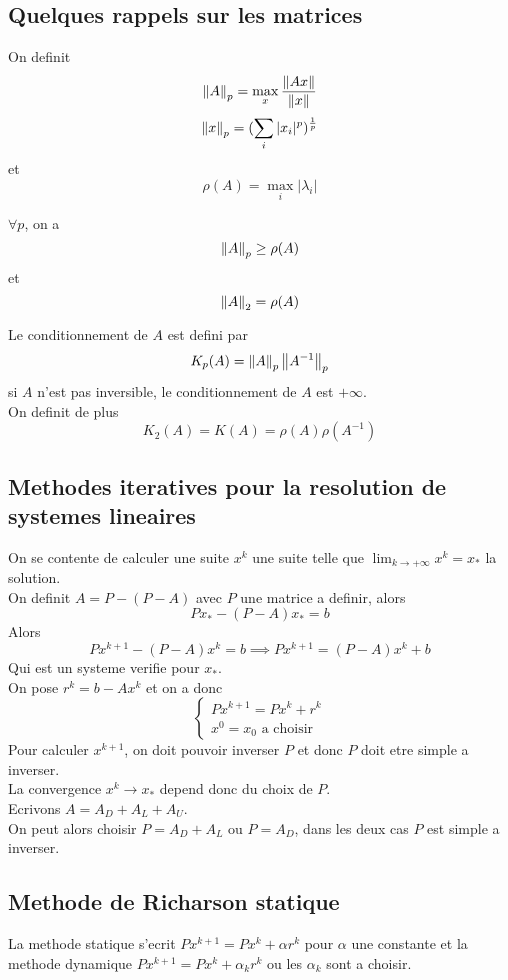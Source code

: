 \documentclass[../main.tex]{subfiles}
\begin{document}
\subsection{Quelques rappels sur les matrices}
On definit
\[ 
\left\lVert A\right\rVert _p = \max_{x}  \frac{ \left\lVert Ax\right\rVert }{\left\lVert x\right\rVert }
\]
\[ 
\left\lVert x\right\rVert _p = ( \sum_i |x_i| ^{p}) ^{\frac{1}{p}}
\]
et 
\[ 
\rho( A) = \max_i |\lambda_i|
\]
\begin{propo}
$\forall p$, on a 
\[ 
\left\lVert A\right\rVert _p \geq \rho( A) 
\]
et 
\[ 
\left\lVert A\right\rVert_2 = \rho( A) 
\]
\end{propo}
\begin{defn}
	Le conditionnement de $A$ est defini par
	\[ 
	K_p( A) = \left\lVert A\right\rVert _p \left\lVert A^{-1}\right\rVert_p
	\]
	si $A$ n'est pas inversible, le conditionnement de $A$ est $+ \infty $.\\
	On definit de plus
	\[ 
	K_2 ( A) = K( A) = \rho( A) \rho( A^{-1}) 
	\]
	
	
\end{defn}
\subsection{Methodes iteratives pour la resolution de systemes lineaires}
On se contente de calculer une suite $x^{k}$ une suite telle que $ \lim_{k \to  + \infty} x^{k} = x_*$ la solution.\\
On definit $ A= P - ( P-A) $ avec $ P$ une matrice a definir, alors
\[ 
Px_* - ( P-A) x_* = b
\]
Alors
\[ 
Px^{k+1}- ( P-A) x^{k}= b\implies P x^{k+1}= ( P-A) x^{k} + b
\]
Qui est un systeme verifie pour $x_*$.\\
On pose $r^{k}= b- Ax^{k}$ et on a donc
\[ 
\begin{cases}
P x^{k+1}= P x^{k} + r^{k}\\
x^{0}= x_0 \text{  a choisir } 
\end{cases}
\]
Pour calculer $x^{k+1}$, on doit pouvoir inverser $ P$ et donc $P$ doit etre simple a inverser.\\
La convergence $x^{k}\to x_*$ depend donc du choix de $P$.\\
Ecrivons $ A= A_D + A_L + A_U$.\\
On peut alors choisir $P = A_D + A_L$ ou  $ P= A_D$, dans les deux cas $ P$ est simple a inverser.
\subsection*{Methode de Richarson statique}
 La methode statique s'ecrit $ P x^{k+1}= P x^{k}+ \alpha r^{k}$ pour $\alpha $ une constante et la methode dynamique $ Px^{k+1}= Px^{k}+ \alpha_k r^{k}$ ou les $\alpha_k$ sont a choisir.\\
\end{document}
